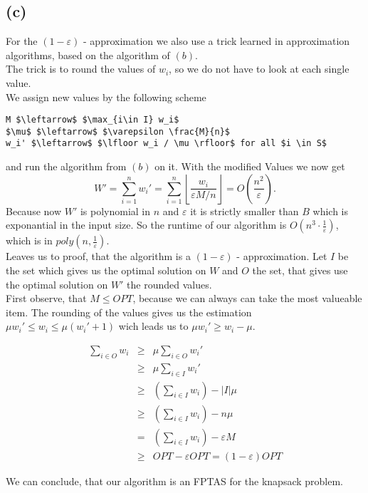\subsection*{(c)}

For the $(1 - \varepsilon)$ - approximation we also use a trick learned in approximation algorithms, based on the algorithm of $(b)$.\\

The trick is to round the values of $w_i$, so we do not have to look at each single value.\\

We assign new values by the following scheme

\begin{lstlisting}
M $\leftarrow$ $\max_{i\in I} w_i$
$\mu$ $\leftarrow$ $\varepsilon \frac{M}{n}$
w_i' $\leftarrow$ $\lfloor w_i / \mu \rfloor$ for all $i \in S$
\end{lstlisting}

and run the algorithm from $(b)$ on it.
With the modified Values we now get
$$
W' = \underset{i=1}{\overset{n}{\sum}} w_i' = \underset{i=1}{\overset{n}{\sum}} \left\lfloor \frac{w_i}{\varepsilon M/n} \right\rfloor = O(\frac{n^2}{\varepsilon}).
$$
Because now $W'$ is polynomial in $n$ and $\varepsilon$ it is strictly smaller than $B$ which is exponantial in the input size. So the runtime of our algorithm
is $O(n^3 \cdot \frac{1}{\varepsilon})$, which is in $poly(n,\frac{1}{\varepsilon})$.\\

Leaves us to proof, that the algorithm is a $(1-\varepsilon)$ - approximation.
Let $I$ be the set which gives us the optimal solution on $W$ and $O$ the set, that gives use the optimal solution on $W'$ the rounded values.\\

First observe, that $M \leq OPT$, because we can always can take the most valueable item. The rounding of the values gives us the estimation 
$ \mu w_i' \leq w_i \leq \mu (w_i' + 1)$ wich leads us to $\mu w_i'  \geq w_i - \mu$.

$$\begin{array}{rcl}
    \underset{i \in O}{\sum} w_i &\geq& \mu \underset{i \in O}{\sum} w_i'\\
        &\geq& \mu \underset{i \in I}{\sum} w_i'\\
        &\geq& (\underset{i \in I}{\sum} w_i) - |I|\mu\\
        &\geq& (\underset{i \in I}{\sum} w_i) - n \mu\\
        &=& (\underset{i \in I}{\sum} w_i) - \varepsilon M\\
        &\geq& OPT - \varepsilon OPT = (1-\varepsilon) OPT
\end{array}$$ 

We can conclude, that our algorithm is an FPTAS for the knapsack problem.
